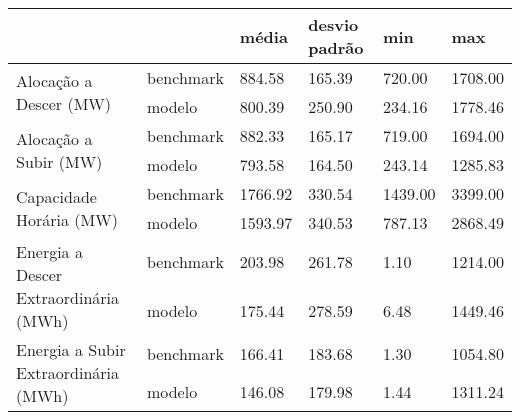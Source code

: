 \begin{tabular}{llllll}
\toprule
 &  & média & desvio padrão & min & max \\
\midrule
\multirow[t]{2}{*}{Alocação a Descer (MW)} & benchmark & 884.58 & 165.39 & 720.00 & 1708.00 \\
 & modelo & 800.39 & 250.90 & 234.16 & 1778.46 \\
\cline{1-6}
\multirow[t]{2}{*}{Alocação a Subir (MW)} & benchmark & 882.33 & 165.17 & 719.00 & 1694.00 \\
 & modelo & 793.58 & 164.50 & 243.14 & 1285.83 \\
\cline{1-6}
\multirow[t]{2}{*}{Capacidade Horária (MW)} & benchmark & 1766.92 & 330.54 & 1439.00 & 3399.00 \\
 & modelo & 1593.97 & 340.53 & 787.13 & 2868.49 \\
\cline{1-6}
\multirow[t]{2}{*}{Energia a Descer Extraordinária (MWh)} & benchmark & 203.98 & 261.78 & 1.10 & 1214.00 \\
 & modelo & 175.44 & 278.59 & 6.48 & 1449.46 \\
\cline{1-6}
\multirow[t]{2}{*}{Energia a Subir Extraordinária (MWh)} & benchmark & 166.41 & 183.68 & 1.30 & 1054.80 \\
 & modelo & 146.08 & 179.98 & 1.44 & 1311.24 \\
\cline{1-6}
\bottomrule
\end{tabular}
